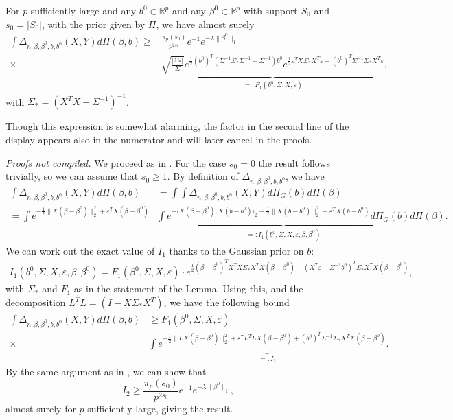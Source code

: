 \documentclass[11pt]{article}
\renewenvironment{proof}[1]{\par\noindent{\bf #1 \ }}{\hfill\BlackBox\\[2mm]}
\renewenvironment{proof}[1]{\textit{Proofs not compiled.}}{}
\newcommand{\eps}{\varepsilon}
\newcommand{\R}{\mathbb{R}}
\newcommand{\bezero}{\beta^0}
\newcommand{\lratio}{\Delta_{n, \beta, \bezero, b, b^0}}
\newcommand{\Pig}{\Pi_{G}}
\newcommand{\postCov}{\Sigma_*}
\numberwithin{equation}{section}
\begin{document}
\begin{lemma}\label{lem:denom_control}
	For $p$ sufficiently large and any $b^0 \in \R^p$ and any $\bezero \in \R^p$ with support $S_0$ and $s_0 = |S_0|$, with the prior given by $\Pi$, we have almost surely
	\begin{align*}
		\int \lratio(X, Y) d\Pi(\beta, b) \geq &\frac{\pi_p(s_0)}{ p^{2s_0}}e^{-1}e^{-\lambda\|\bezero\|_1}\\
		\times & \underbrace{\sqrt{\frac{|\postCov |}{|\Sigma|}}e^{\frac{1}{2}(b^0)^T\left(\Sigma^{-1}\postCov  \Sigma^{-1}  - \Sigma^{-1}\right)b^0 }e^{\frac{1}{2}\eps^T X\postCov X^T\eps - (b^0)^T\Sigma^{-1}\postCov  X^T \eps}}_{=: F_1(b^0, \Sigma, X,\eps)},
	\end{align*}
	with $\postCov  = (X^TX + \Sigma^{-1})^{-1}$.
\end{lemma}
Though this expression is somewhat alarming, the factor in the second line of the display appears also in the numerator and will later cancel in the proofs.

\begin{proof}{Proof of Lemma \ref{lem:denom_control}.}
	We proceed as in \cite{CS-HV2015}. For the case $s_0 = 0$ the result follows trivially, so we can assume that $s_0 \geq 1$.
	By definition of $\lratio$, we have
	\begin{align*}
				\int \lratio(X, Y) d\Pi(\beta, b) &= \int \int \lratio (X, Y)d\Pig(b)d\Pi(\beta) \\ 
				= \int e^{-\frac{1}{2}\|X(\beta - \bezero)\|_2^2 + \eps^T X(\beta - \bezero)} &\underbrace{\int e^{-\langle X(\beta - \beta^0), X(b - b^0)  \rangle_2 -\frac{1}{2}\|X(b - b^0)\|_2^2 + \eps^TX(b - b^0)}d\Pig(b)}_{=: I_1(b^0, \Sigma, X, \eps, \beta, \bezero)} d\Pi(\beta).
	\end{align*}
	We can work out the exact value of $I_1$ thanks to the Gaussian prior on $b$:
	\begin{align}
		I_1(b^0, \Sigma, X, \eps, \beta, \bezero) = F_1(\bezero, \Sigma, X, \eps)\cdot e^{\frac{1}{2}(\beta - \beta^0)^T X^TX \postCov X^TX(\beta - \beta^0)  - (X^T\eps - \Sigma^{-1}b^0)^T\postCov  X^TX(\beta - \beta^0)}, \label{eq:I_1}
	\end{align}
	with $\postCov $ and $F_1$ as in the statement of the Lemma.
Using this, and the decomposition $L^T L = (I -X\postCov X^T)$, we have the following bound
	\begin{align*}
		\int \lratio(X, Y) d\Pi(\beta, b) &\geq F_1(\bezero, \Sigma, X, \eps) \\
		\times& \underbrace{\int e^{-\frac{1}{2}\|LX(\beta - \bezero)\|_2^2 + \eps^T L^TL X(\beta - \bezero) + (b^0)^T\Sigma^{-1}\postCov  X^T X (\beta - \beta^0)}}_{=: I_2}.
	\end{align*}
	By the same argument as in \cite{CS-HV2015}, we can show that
	$$
	I_2 \geq \frac{\pi_p(s_0)}{p^{2s_0}}e^{-1} e^{-\lambda\|\beta^0\|_1},
	$$
	almost surely for $p$ sufficiently large, giving the result.
\end{proof}
\end{document}
